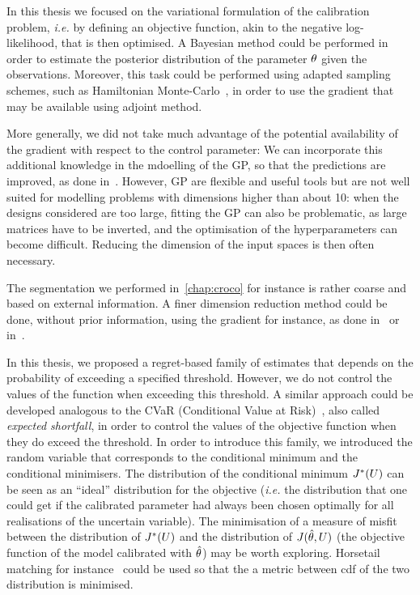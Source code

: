 \documentclass[../../Main_ManuscritThese.tex]{subfiles}
\begin{document}
In this thesis we focused on the variational formulation of the
calibration problem, \emph{i.e.} by defining an objective function,
akin to the negative log-likelihood, that is then optimised. A
Bayesian method could be performed in order to estimate the posterior
distribution of the parameter $\theta$ given the observations. Moreover,
this task could be performed using adapted sampling schemes, such as
Hamiltonian Monte-Carlo~\cite{betancourt_conceptual_2017}, in order to
use the gradient that may be available using adjoint method.

More generally, we did not take much advantage of the potential
availability of the gradient with respect to the control parameter: We
can incorporate this additional knowledge in the mdoelling of the GP,
so that the predictions are improved, as done
in~\cite{bouhlel_gradient-enhanced_2019,laurent_overview_2019}.
However, GP are flexible and useful tools but are not well suited for
modelling problems with dimensions higher than about 10: when the
designs considered are too large, fitting the GP can also be
problematic, as large matrices have to be inverted, and the
optimisation of the hyperparameters can become difficult. Reducing the
dimension of the input spaces is then often necessary.

The segmentation we performed in~\cref{chap:croco} for instance is
rather coarse and based on external information. A finer dimension
reduction method could be done, without prior information, using the
gradient for instance, as done in~\cite{benameur_refinement_2002} or
in~\cite{zahm_certified_2018}.


In this thesis, we proposed a regret-based family of estimates that
depends on the probability of exceeding a specified
threshold. However, we do not control the values of the function when
exceeding this threshold. A similar approach could be developed
analogous to the CVaR (Conditional Value at
Risk)~\cite{rockafellar_conditional_2002}, also called \emph{expected
  shortfall}, in order to control the values of the objective function
when they do exceed the threshold.
In order to introduce this family, we introduced the random variable
that corresponds to the conditional minimum and the conditional
minimisers. The distribution of the conditional minimum $J^*(U)$ can
be seen as an ``ideal'' distribution for the objective (\emph{i.e.} the
distribution that one could get if the calibrated parameter had always
been chosen optimally for all realisations of the uncertain
variable). The minimisation of a measure of misfit between the
distribution of $J^*(U)$ and the distribution of $J(\hat{\theta},U)$
(the objective function of the model calibrated with $\hat{\theta}$) may
be worth exploring. Horsetail matching for
instance~\cite{cook_extending_2017,cook_horsetail_2018} could be used
so that the a metric between cdf of the two distribution is minimised.



\etoile
\vfill

\subfileLocal{
	\pagestyle{empty}
	
        
}

\end{document}
